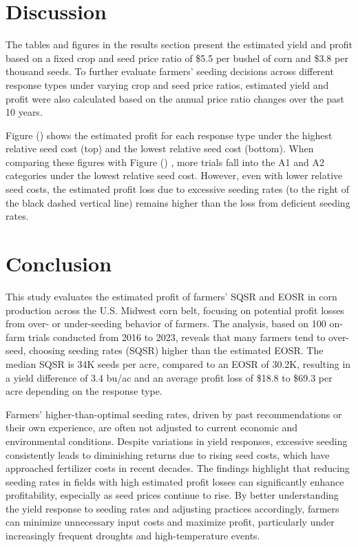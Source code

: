 \documentclass[
]{article}
\begin{document}
\section{Discussion}\label{discussion}

The tables and figures in the results section present the estimated
yield and profit based on a fixed crop and seed price ratio of \$5.5 per
bushel of corn and \$3.8 per thousand seeds. To further evaluate
farmers' seeding decisions across different response types under varying
crop and seed price ratios, estimated yield and profit were also
calculated based on the annual price ratio changes over the past 10
years.

Figure
()
shows the estimated profit for each response type under the highest
relative seed cost (top) and the lowest relative seed cost (bottom).
When comparing these figures with Figure
()
, more trials fall into the A1 and A2 categories under the lowest
relative seed cost. However, even with lower relative seed costs, the
estimated profit loss due to excessive seeding rates (to the right of
the black dashed vertical line) remains higher than the loss from
deficient seeding rates.

\section{Conclusion}\label{conclusion}

This study evaluates the estimated profit of farmers' SQSR and EOSR in
corn production across the U.S. Midwest corn belt, focusing on potential
profit losses from over- or under-seeding behavior of farmers. The
analysis, based on 100 on-farm trials conducted from 2016 to 2023,
reveals that many farmers tend to over-seed, choosing seeding rates
(SQSR) higher than the estimated EOSR. The median SQSR is 34K seeds per
acre, compared to an EOSR of 30.2K, resulting in a yield difference of
3.4 bu/ac and an average profit loss of \$18.8 to \$69.3 per acre
depending on the response type.

Farmers' higher-than-optimal seeding rates, driven by past
recommendations or their own experience, are often not adjusted to
current economic and environmental conditions. Despite variations in
yield responses, excessive seeding consistently leads to diminishing
returns due to rising seed costs, which have approached fertilizer costs
in recent decades. The findings highlight that reducing seeding rates in
fields with high estimated profit losses can significantly enhance
profitability, especially as seed prices continue to rise. By better
understanding the yield response to seeding rates and adjusting
practices accordingly, farmers can minimize unnecessary input costs and
maximize profit, particularly under increasingly frequent droughts and
high-temperature events.
\end{document}
